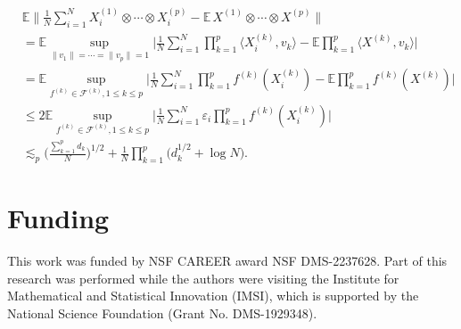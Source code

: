 \documentclass[numbers,webpdf,imaiai]{ima-authoring-template}
\theoremstyle{thmstyletwo}%
\numberwithin{equation}{section}
\numberwithin{equation}{section}
\newcommand{\E}{\mathbb{E}}
\begin{document}
\begin{align*}
&\E \bigg\|\frac{1}{N}\sum_{i=1}^{N} X^{(1)}_i\otimes \cdots \otimes X^{(p)}_{i} -\E\, X^{(1)}\otimes \cdots\otimes X^{(p)} \bigg\| \\
&= \E \sup_{\|v_1\|=\cdots =\|v_p\|=1} \bigg|\frac{1}{N}\sum_{i=1}^N \prod_{k=1}^{p} \langle X^{(k)}_i, v_k\rangle- \E \prod_{k=1}^{p} \langle X^{(k)} , v_k \rangle \bigg|\\
&=\E \sup_{f^{(k)} \in \mathcal{F}^{(k)},1\le k\le p}\bigg|\frac{1}{N} \sum_{i=1}^N \prod_{k=1}^p f^{(k)} (X^{(k)}_i)-\mathbb{E} \prod_{k=1}^p f^{(k)} (X^{(k)})\bigg|\\
&\le 2\E \sup_{f^{(k)} \in \mathcal{F}^{(k)},1\le k\le p}\bigg|\frac{1}{N} \sum_{i=1}^N \varepsilon_i \prod_{k=1}^p f^{(k)} (X^{(k)}_i)\bigg|\\
&\lesssim_p \bigg(\frac{\sum_{k=1}^p d_k}{N}\bigg)^{1/2}+\frac{1}{N}\prod_{k=1}^{p}\big(d_k^{1/2}+\log N\big).
\end{align*}

















\section*{Funding}
This work was funded by NSF CAREER award NSF DMS-2237628. Part of this research was performed while the authors were visiting the Institute for Mathematical and Statistical Innovation (IMSI), which is supported by the National Science Foundation (Grant No. DMS-1929348).
\end{document}
